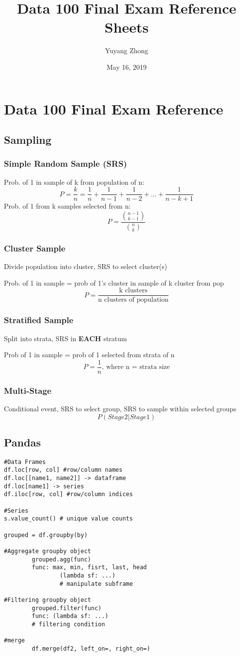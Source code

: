 \documentclass[8pt]{extarticle}
\title{Data 100 Final Exam Reference Sheets}
\author{Yuyang Zhong}
\date{May 16, 2019}
\begin{document}
\section*{Data 100 Final Exam Reference}

\subsection*{Sampling}
\subsubsection*{Simple Random Sample (SRS)}
Prob. of 1 in sample of k from population of n:
$$ P = \frac{k}{n} = \frac{1}{n} + \frac{1}{n-1} + \frac{1}{n-2} + ... + \frac{1}{n-k+1}  $$
Prob. of 1 from k samples selected from n:
$$ P= \frac{{n-1\choose k-1}}{{n\choose k}} $$

\subsubsection*{Cluster Sample}
Divide population into cluster, SRS to select cluster(s)

Prob. of 1 in sample = prob of 1's cluster in sample of k cluster from pop
$$ P =\frac{\text{k clusters}}{\text{n  clusters of population}} $$


\subsubsection*{Stratified Sample}
Split into strata, SRS in \textbf{EACH} stratum

Prob of 1 in sample = prob of 1 selected from strata of n 
$$ P = \frac{1}{n} \text{, where n = strata size} $$

\subsubsection*{Multi-Stage}
Conditional event, SRS to select group, SRS to sample within selected groups
$$ P(Stage 2 | Stage 1) $$
\hline

\subsection*{Pandas}
\begin{verbatim}
#Data Frames
df.loc[row, col] #row/column names
df.loc[[name1, name2]] -> dataframe
df.loc[name1] -> series
df.iloc[row, col] #row/column indices

#Series
s.value_count() # unique value counts

grouped = df.groupby(by)
        
#Aggregate groupby object
        grouped.agg(func)
        func: max, min, fisrt, last, head
                (lambda sf: ...) 
                # manipulate subframe
                
#Filtering groupby object
        grouped.filter(func)
        func: (lambda sf: ...) 
        # filtering condition

#merge
        df.merge(df2, left_on=, right_on=)
\end{verbatim}
\hline
\end{document}
